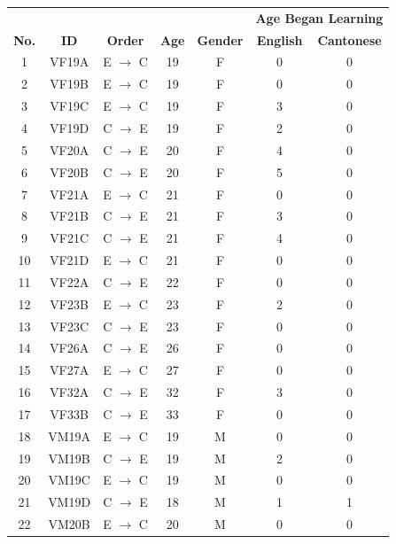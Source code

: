 \begin{table}[!htbp]
  \begin{center}
    \footnotesize
      \begin{tabular}{ccccccc}
  \toprule
    & & & &                & \multicolumn{2}{c}{\textbf{Age Began Learning}} \\
  \textbf{No.} & \textbf{ID} & \textbf{Order} & \textbf{Age} & \textbf{Gender} & \textbf{English} & \textbf{Cantonese} \\
  \midrule
  1 & VF19A & E $\rightarrow$ C & 19  & F & 0   & 0 \\
  2 & VF19B & E $\rightarrow$ C & 19  & F & 0   & 0 \\
  3 & VF19C & E $\rightarrow$ C & 19  & F & 3   & 0 \\
  4 & VF19D & C $\rightarrow$ E & 19  & F & 2   & 0 \\
  5 & VF20A & C $\rightarrow$ E & 20  & F & 4   & 0 \\
  6 & VF20B & C $\rightarrow$ E & 20  & F & 5   & 0 \\
  7 & VF21A & E $\rightarrow$ C & 21  & F & 0   & 0 \\
  8 & VF21B & C $\rightarrow$ E & 21  & F & 3   & 0 \\
  9 & VF21C & C $\rightarrow$ E & 21  & F & 4   & 0 \\
  10  & VF21D & E $\rightarrow$ C & 21  & F & 0   & 0 \\
  11  & VF22A & C $\rightarrow$ E & 22  & F & 0   & 0 \\
  12  & VF23B & E $\rightarrow$ C & 23  & F & 2   & 0 \\
  13  & VF23C & C $\rightarrow$ E & 23  & F & 0   & 0 \\
  14  & VF26A & C $\rightarrow$ E & 26  & F & 0   & 0 \\
  15  & VF27A & E $\rightarrow$ C & 27  & F & 0   & 0 \\
  16  & VF32A & C $\rightarrow$ E & 32  & F & 3   & 0 \\
  17  & VF33B & C $\rightarrow$ E & 33  & F & 0   & 0 \\
  18  & VM19A & E $\rightarrow$ C & 19  & M & 0   & 0 \\
  19  & VM19B & C $\rightarrow$ E & 19  & M & 2   & 0 \\
  20  & VM19C & E $\rightarrow$ C & 19  & M & 0   & 0 \\
  21  & VM19D & C $\rightarrow$ E & 18  & M & 1   & 1 \\
  22  & VM20B & E $\rightarrow$ C & 20  & M & 0   & 0 \\

\end{tabular}
\end{center}
\end{table}
